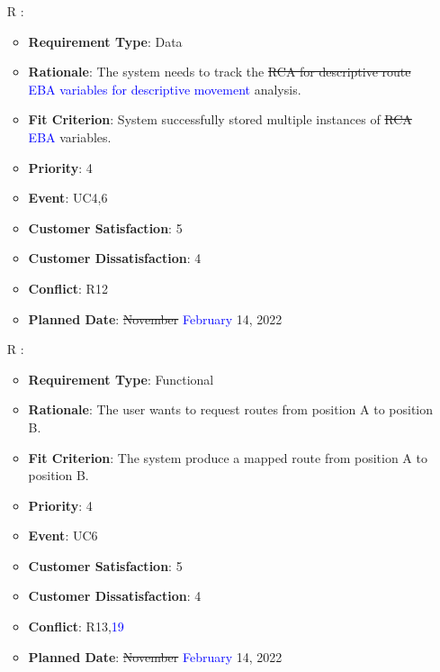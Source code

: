 \documentclass[12pt, titlepage]{article}
\newcounter{reqnum} %
\begin{document}
\begin{itemize}
\item[R\refstepcounter{reqnum}\thereqnum
\label{R_Inputs_1}:] 
\begin{itemize}
    \item \textbf{Requirement Type}: Data
    \item \textbf{Rationale}: The system needs to track the \sout{RCA for descriptive route} \textcolor{blue}{EBA variables for descriptive movement} analysis. 
    \item \textbf{Fit Criterion}: System successfully stored multiple instances of \sout{RCA} \textcolor{blue}{EBA} variables. 
    \item \textbf{Priority}: 4
    \item \textbf{Event}: UC4,6
    \item \textbf{Customer Satisfaction}: 5
    \item \textbf{Customer Dissatisfaction}: 4
    \item \textbf{Conflict}: R12
    \item \textbf{Planned Date}: \sout{November} \textcolor{blue}{February} 14, 2022
\end{itemize}

\item[R\refstepcounter{reqnum}\thereqnum
\label{R_Inputs_1}:] 
\begin{itemize}
    \item \textbf{Requirement Type}: Functional
    \item \textbf{Rationale}: The user wants to request routes from position A to position B.
    \item \textbf{Fit Criterion}: The system produce a mapped route from position A to position B.
    \item \textbf{Priority}: 4
    \item \textbf{Event}: UC6
    \item \textbf{Customer Satisfaction}: 5
    \item \textbf{Customer Dissatisfaction}: 4
    \item \textbf{Conflict}: R13,\textcolor{blue}{19}
    \item \textbf{Planned Date}: \sout{November} \textcolor{blue}{February} 14, 2022
\end{itemize}


\end{itemize}
\end{document}
